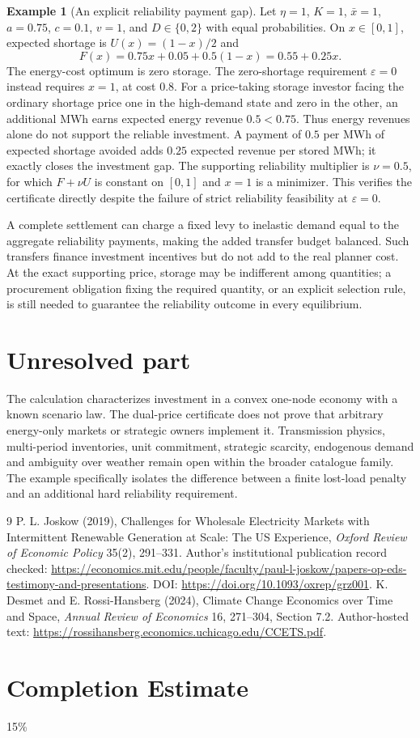 \documentclass[11pt]{article}
\theoremstyle{definition}
\newtheorem{example}{Example}
\begin{document}
\begin{example}[An explicit reliability payment gap]
Let $\eta=1$, $K=1$, $\bar x=1$, $a=0.75$, $c=0.1$, $v=1$, and $D\in\{0,2\}$ with equal probabilities. On $x\in[0,1]$, expected shortage is $U(x)=(1-x)/2$ and
\[
 F(x)=0.75x+0.05+0.5(1-x)=0.55+0.25x.
\]
The energy-cost optimum is zero storage. The zero-shortage requirement $\varepsilon=0$ instead requires $x=1$, at cost $0.8$. For a price-taking storage investor facing the ordinary shortage price one in the high-demand state and zero in the other, an additional MWh earns expected energy revenue $0.5<0.75$. Thus energy revenues alone do not support the reliable investment. A payment of $0.5$ per MWh of expected shortage avoided adds $0.25$ expected revenue per stored MWh; it exactly closes the investment gap. The supporting reliability multiplier is $\nu=0.5$, for which $F+\nu U$ is constant on $[0,1]$ and $x=1$ is a minimizer. This verifies the certificate directly despite the failure of strict reliability feasibility at $\varepsilon=0$.
\end{example}
A complete settlement can charge a fixed levy to inelastic demand equal to the aggregate reliability payments, making the added transfer budget balanced. Such transfers finance investment incentives but do not add to the real planner cost. At the exact supporting price, storage may be indifferent among quantities; a procurement obligation fixing the required quantity, or an explicit selection rule, is still needed to guarantee the reliability outcome in every equilibrium.

\section*{Unresolved part}
The calculation characterizes investment in a convex one-node economy with a known scenario law. The dual-price certificate does not prove that arbitrary energy-only markets or strategic owners implement it. Transmission physics, multi-period inventories, unit commitment, strategic scarcity, endogenous demand and ambiguity over weather remain open within the broader catalogue family. The example specifically isolates the difference between a finite lost-load penalty and an additional hard reliability requirement.
\begin{thebibliography}{9}
 P. L. Joskow (2019), Challenges for Wholesale Electricity Markets with Intermittent Renewable Generation at Scale: The US Experience, \emph{Oxford Review of Economic Policy} 35(2), 291--331. Author's institutional publication record checked: \url{https://economics.mit.edu/people/faculty/paul-l-joskow/papers-op-eds-testimony-and-presentations}. DOI: \url{https://doi.org/10.1093/oxrep/grz001}.
 K. Desmet and E. Rossi-Hansberg (2024), Climate Change Economics over Time and Space, \emph{Annual Review of Economics} 16, 271--304, Section 7.2. Author-hosted text: \url{https://rossihansberg.economics.uchicago.edu/CCETS.pdf}.
\end{thebibliography}

\section{Completion Estimate}
15\%
\end{document}
